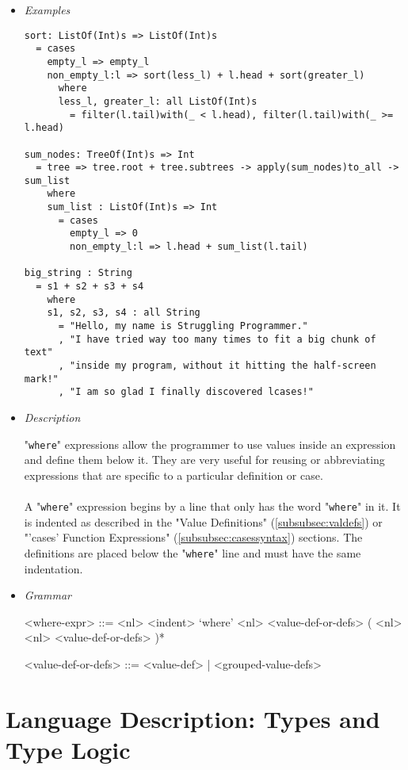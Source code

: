 \documentclass{article}
\begin{document}
\begin{itemize}

\item \textit{Examples}
\begin{verbatim}
sort: ListOf(Int)s => ListOf(Int)s
  = cases
    empty_l => empty_l
    non_empty_l:l => sort(less_l) + l.head + sort(greater_l)
      where
      less_l, greater_l: all ListOf(Int)s
        = filter(l.tail)with(_ < l.head), filter(l.tail)with(_ >= l.head)

sum_nodes: TreeOf(Int)s => Int
  = tree => tree.root + tree.subtrees -> apply(sum_nodes)to_all -> sum_list
    where
    sum_list : ListOf(Int)s => Int
      = cases
        empty_l => 0
        non_empty_l:l => l.head + sum_list(l.tail)

big_string : String
  = s1 + s2 + s3 + s4
    where
    s1, s2, s3, s4 : all String
      = "Hello, my name is Struggling Programmer."
      , "I have tried way too many times to fit a big chunk of text"
      , "inside my program, without it hitting the half-screen mark!"
      , "I am so glad I finally discovered lcases!"
\end{verbatim}

\item \textit{Description}

"\verb|where|" expressions allow the programmer to use values inside an
expression and define them below it. They are very useful for reusing or
abbreviating expressions that are specific to a particular definition or case.
\\\\
A "\verb|where|" expression begins by a line that only has the word
"\verb|where|" in it. It is indented as described in the "Value Definitions"
(\ref{subsubsec:valdefs}) or "'cases' Function Expressions"
(\ref{subsubsec:casessyntax}) sections.  The definitions are placed below the
"\verb|where|" line and must have the same indentation. 

\item \textit{Grammar}
\begin{grammar}
<where-expr> ::=
<nl> <indent> `where'
<nl> <value-def-or-defs> ( <nl> <nl> <value-def-or-defs> )*

<value-def-or-defs> ::= <value-def> | <grouped-value-defs> 
\end{grammar}

\end{itemize}

\newpage

\section{Language Description: Types and Type Logic}
\end{document}
